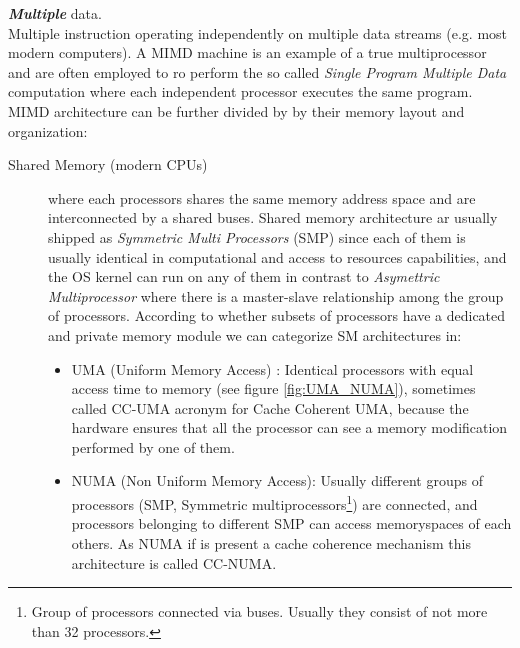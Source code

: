 \begin{description}
\textit{\textbf{Multiple}} data. \hfill \\ Multiple instruction operating
independently on multiple data streams (e.g. most modern computers). A MIMD machine is an example of a true multiprocessor and are often employed to ro perform the so called \textit{Single Program Multiple Data} computation where each independent processor executes the same program.
MIMD architecture can be further divided by by their memory layout and organization:
\begin{description}
	\item [Shared Memory (modern CPUs)] where each processors shares the same memory address space and are interconnected by a shared buses. 	Shared memory architecture ar usually shipped as \textit{Symmetric Multi Processors} (SMP) since each of them is usually identical in computational and access to resources capabilities, and the OS kernel can run on any of them in contrast to \textit{Asymettric Multiprocessor} where there is a master-slave relationship  among the group of processors. According to whether subsets of processors have a dedicated and private memory module we can categorize SM architectures in:	
	\begin{itemize}
		\item UMA (Uniform Memory Access) : Identical processors with equal
		access time to memory (see figure \ref{fig:UMA_NUMA}),
		sometimes called CC-UMA acronym for Cache Coherent UMA, because the
		hardware ensures that all the processor can see a memory modification
		performed by one of them.
		\item NUMA (Non Uniform Memory Access): Usually different groups
		of processors (SMP, Symmetric multiprocessors\footnote{Group of processors connected via buses. Usually they consist of not more than 32 processors.}) are connected, and processors belonging to different SMP can access memoryspaces of each others. As NUMA if is present a cache coherence mechanism this architecture is called CC-NUMA.
		\begin{figure}
			\centering
			\setlength{\fboxrule}{0.5pt}%

\end{figure}
\end{itemize}
\end{description}
\end{description}
